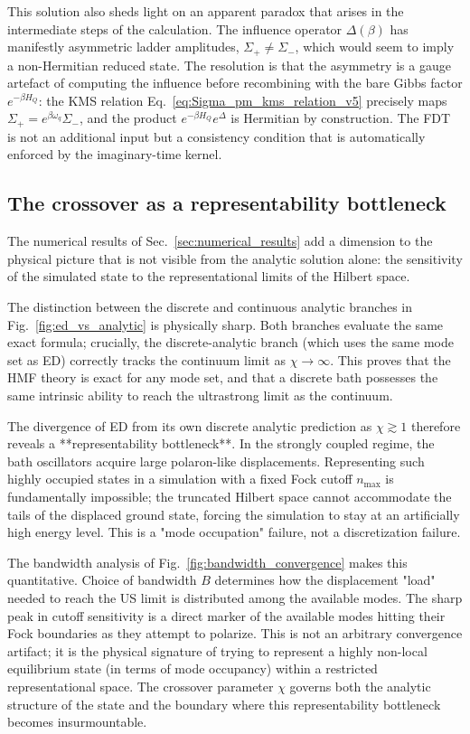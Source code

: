 This solution also sheds light on an apparent paradox that arises in the
intermediate steps of the calculation.
The influence operator $\Delta(\beta)$ has manifestly asymmetric ladder
amplitudes, $\Sigma_+ \neq \Sigma_-$, which would seem to imply a
non-Hermitian reduced state.
The resolution is that the asymmetry is a gauge artefact of computing
the influence before recombining with the bare Gibbs factor $e^{-\beta H_Q}$:
the KMS relation Eq.~\eqref{eq:Sigma_pm_kms_relation_v5} precisely maps
$\Sigma_+ = e^{\beta\omega_q}\Sigma_-$, and the product $e^{-\beta H_Q}e^\Delta$
is Hermitian by construction.
The FDT is not an additional input but a consistency condition that
is automatically enforced by the imaginary-time kernel.

\subsection*{The crossover as a representability bottleneck}

The numerical results of Sec.~\ref{sec:numerical_results} add a
dimension to the physical picture that is not visible from the analytic
solution alone: the sensitivity of the simulated state to the 
representational limits of the Hilbert space.

The distinction between the discrete and continuous analytic branches
in Fig.~\ref{fig:ed_vs_analytic} is physically sharp.
Both branches evaluate the same exact formula; crucially, the 
discrete-analytic branch (which uses the same mode set as ED) correctly 
tracks the continuum limit as $\chi \to \infty$. This proves that the 
HMF theory is exact for any mode set, and that a discrete bath possesses 
the same intrinsic ability to reach the ultrastrong limit as the continuum.

The divergence of ED from its own discrete analytic prediction as 
$\chi \gtrsim 1$ therefore reveals a **representability bottleneck**.
In the strongly coupled regime, the bath oscillators acquire large 
polaron-like displacements. Representing such highly occupied states in 
a simulation with a fixed Fock cutoff $n_{\max}$ is fundamentally impossible; 
the truncated Hilbert space cannot accommodate the tails of the displaced 
ground state, forcing the simulation to stay at an artificially high energy 
level. This is a "mode occupation" failure, not a discretization failure.

The bandwidth analysis of Fig.~\ref{fig:bandwidth_convergence} makes this 
quantitative. Choice of bandwidth $B$ determines how the displacement "load" 
needed to reach the US limit is distributed among the available modes. 
The sharp peak in cutoff sensitivity is a direct marker of the available 
modes hitting their Fock boundaries as they attempt to polarize. This is 
not an arbitrary convergence artifact; it is the physical signature of 
trying to represent a highly non-local equilibrium state (in terms of mode 
occupancy) within a restricted representational space. The crossover 
parameter $\chi$ governs both the analytic structure of the state and the 
boundary where this representability bottleneck becomes insurmountable.

